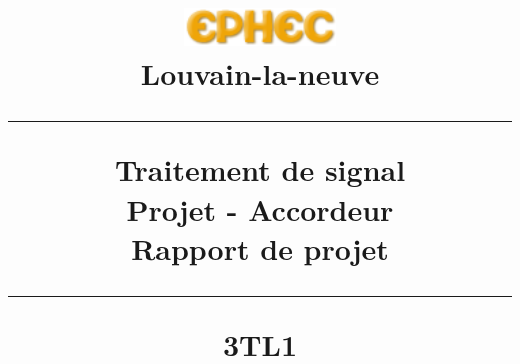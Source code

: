 \title{
\parbox{15cm}
{\includegraphics[width=4cm]{ephec.png} \\ 
  Louvain-la-neuve\\
  \vspace{3cm}
	\begin{center}\sf\bfseries\Huge
		\rule{15cm}{1pt}
		\medskip
		Traitement de signal\\
		\huge Projet - Accordeur\\
		\vspace{.5cm}
		\Large Rapport de projet
		\vspace{.5cm}
		\rule{15cm}{1pt}
		\large 3TL1
	\end{center}
	\vspace{3cm}
}} 